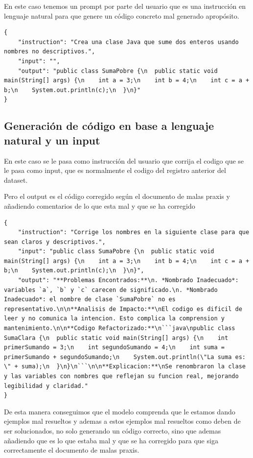 En este caso tenemos un prompt por parte del usuario que es una instrucción en lenguaje natural para que genere un código concreto mal generado apropósito.

\begin{lstlisting}[style=json]
{
    "instruction": "Crea una clase Java que sume dos enteros usando nombres no descriptivos.",
    "input": "",
    "output": "public class SumaPobre {\n  public static void main(String[] args) {\n    int a = 3;\n    int b = 4;\n    int c = a + b;\n    System.out.println(c);\n  }\n}"
}
\end{lstlisting}

\subsection{Generación de código en base a lenguaje natural y un input}

En este caso se le pasa como instrucción del usuario que corrija el codigo que se le pasa como input, que es normalmente el codigo del registro anterior del dataset.

Pero el output es el código corregido según el documento de malas praxis y añadiendo comentarios de lo que esta mal y que se ha corregido

\newpage
\begin{lstlisting}[style=json]
{
    "instruction": "Corrige los nombres en la siguiente clase para que sean claros y descriptivos.",
    "input": "public class SumaPobre {\n  public static void main(String[] args) {\n    int a = 3;\n    int b = 4;\n    int c = a + b;\n    System.out.println(c);\n  }\n}",
    "output": "**Problemas Encontrados:**\n. *Nombrado Inadecuado*: variables `a`, `b` y `c` carecen de significado.\n. *Nombrado Inadecuado*: el nombre de clase `SumaPobre` no es representativo.\n\n**Analisis de Impacto:**\nEl codigo es dificil de leer y no comunica la intencion. Esto complica la comprension y mantenimiento.\n\n**Codigo Refactorizado:**\n```java\npublic class SumaClara {\n  public static void main(String[] args) {\n    int primerSumando = 3;\n    int segundoSumando = 4;\n    int suma = primerSumando + segundoSumando;\n    System.out.println(\"La suma es: \" + suma);\n  }\n}\n```\n\n**Explicacion:**\nSe renombraron la clase y las variables con nombres que reflejan su funcion real, mejorando legibilidad y claridad."
}
\end{lstlisting}

De esta manera conseguimos que el modelo comprenda que le estamos dando ejemplos mal resueltos y ademas a estos ejemplos mal resueltos como deben de ser solucionados, no solo generando un código correcto, sino que ademas añadiendo que es lo que estaba mal y que se ha corregido para que siga correctamente el documento de malas praxis.

